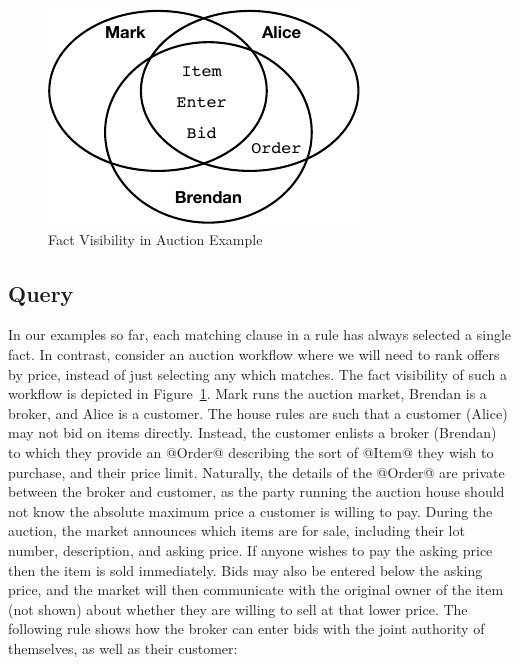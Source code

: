 \begin{figure}
\begin{center}
\includegraphics{figure/auction-visibility.pdf}
\end{center}
\vspace{-2ex}
\caption{Fact Visibility in Auction Example}
\label{f:AuctionVisibility}
\end{figure}


\subsection{Query}
\label{s:Query}
In our examples so far, each matching clause in a rule has always selected a single fact. In contrast, consider an auction workflow where we will need to rank offers by price, instead of just selecting any which matches. The fact visibility of such a workflow is depicted in Figure~\ref{f:AuctionVisibility}. Mark runs the auction market, Brendan is a broker, and Alice is a customer. The house rules are such that a customer (Alice) may not bid on items directly. Instead, the customer enlists a broker (Brendan) to which they provide an @Order@ describing the sort of @Item@ they wish to purchase, and their price limit. Naturally, the details of the @Order@ are private between the broker and customer, as the party running the auction house should not know the absolute maximum price a customer is willing to pay. During the auction, the market announces which items are for sale, including their lot number, description, and asking price. If anyone wishes to pay the asking price then the item is sold immediately. Bids may also be entered below the asking price, and the market will then communicate with the original owner of the item (not shown) about whether they are willing to sell at that lower price. The following rule shows how the broker can enter bids with the joint authority of themselves, as well as their customer:


